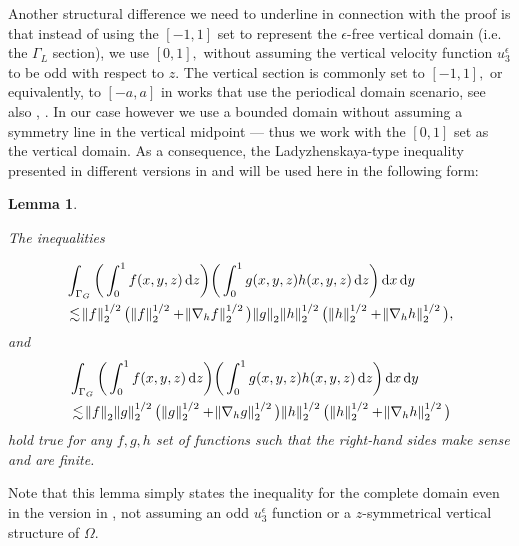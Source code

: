 \documentclass[11pt]{article}
\newtheorem{lemma}{Lemma}
\newcommand*\diff{\mathop{}\!\mathrm{d}}
\begin{document}
Another structural difference we need to underline in connection with the proof is that instead of using the $[-1,1]$ set to represent the $\epsilon$-free vertical domain (i.e. the $\Gamma_L$ section), we use $[0,1],$ without assuming the vertical velocity function $u_3^\epsilon$ to be odd with respect to $z.$ The vertical section is commonly set to $[-1,1],$ or equivalently, to $[-a,a]$ in works that use the periodical domain scenario, see also \cite{cao2016global}, \cite{cao2017global}. In our case however we use a bounded domain without assuming a symmetry line in the vertical midpoint --- thus we work with the $[0,1]$ set as the vertical domain. As a consequence, the Ladyzhenskaya-type inequality presented in different versions in \cite{cao2003global} and \cite{li2019primitive} will be used here in the following form:

\begin{lemma}\label{LadyzhenskayatypeIEQ}

The inequalities

\begin{equation}\nonumber
\begin{split}
& \int_{\Gamma_G} \bigg ( \int_0^1 f(x,y,z) \diff z \bigg) \bigg ( \int_0^1 g(x,y,z) h(x,y,z) \diff z \bigg ) \diff x \diff y \\
& \lesssim \norm{f}_2^{1/2} \big ( \norm{f}_2^{1/2} + \norm{\nabla_h f}_2^{1/2} \big ) \norm{g}_2 \norm{h}_2^{1/2} \big (\norm{h}_2^{1/2} + \norm{\nabla_h h}_2^{1/2} \big ),
\end{split}
\end{equation}
%
and
%
\begin{equation}\nonumber
\begin{split}
& \int_{\Gamma_G} \bigg ( \int_0^1 f(x,y,z) \diff z \bigg) \bigg ( \int_0^1 g(x,y,z) h(x,y,z) \diff z \bigg ) \diff x \diff y \\
& \lesssim \norm{f}_2 \norm{g}_2^{1/2} \big ( \norm{g}_2^{1/2} + \norm{\nabla_h g}_2^{1/2} \big ) \norm{h}_2^{1/2} \big (\norm{h}_2^{1/2} + \norm{\nabla_h h}_2^{1/2} \big )
\end{split}
\end{equation}
%
hold true for any $f,g,h$ set of functions such that the right-hand sides make sense and are finite.

\end{lemma}

Note that this lemma simply states the inequality for the complete domain even in the version in \cite{li2019primitive}, not assuming an odd $u_3^\epsilon$ function or a $z$-symmetrical vertical structure of $\Omega$.
\end{document}
